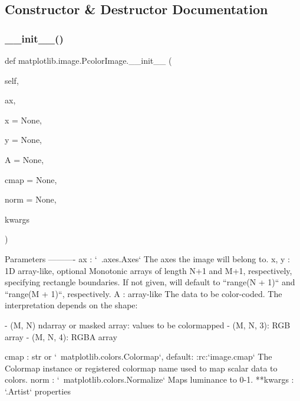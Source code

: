 \subsection{Constructor \& Destructor Documentation}
\mbox{\label{classmatplotlib_1_1image_1_1PcolorImage_a88e5b79e41ec15edef12dc46d3be3187}} 
\subsubsection{\texorpdfstring{\+\_\+\+\_\+init\+\_\+\+\_\+()}{\_\_init\_\_()}}
{\footnotesize\ttfamily def matplotlib.\+image.\+Pcolor\+Image.\+\_\+\+\_\+init\+\_\+\+\_\+ (\begin{DoxyParamCaption}\item[{}]{self,  }\item[{}]{ax,  }\item[{}]{x = {\ttfamily None},  }\item[{}]{y = {\ttfamily None},  }\item[{}]{A = {\ttfamily None},  }\item[{}]{cmap = {\ttfamily None},  }\item[{}]{norm = {\ttfamily None},  }\item[{}]{kwargs }\end{DoxyParamCaption})}

\begin{DoxyVerb}Parameters
----------
ax : `~.axes.Axes`
    The axes the image will belong to.
x, y : 1D array-like, optional
    Monotonic arrays of length N+1 and M+1, respectively, specifying
    rectangle boundaries.  If not given, will default to
    ``range(N + 1)`` and ``range(M + 1)``, respectively.
A : array-like
    The data to be color-coded. The interpretation depends on the
    shape:

    - (M, N) ndarray or masked array: values to be colormapped
    - (M, N, 3): RGB array
    - (M, N, 4): RGBA array

cmap : str or `~matplotlib.colors.Colormap`, default: :rc:`image.cmap`
    The Colormap instance or registered colormap name used to map
    scalar data to colors.
norm : `~matplotlib.colors.Normalize`
    Maps luminance to 0-1.
**kwargs : `.Artist` properties
\end{DoxyVerb}
 

